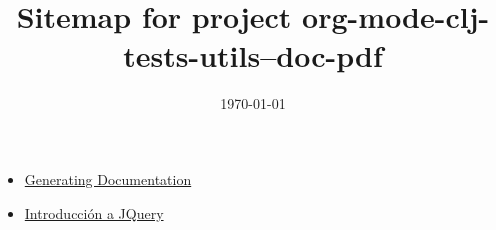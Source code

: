\documentclass[11pt]{article}
\date{\today}
\title{Sitemap for project org-mode-clj-tests-utils--doc-pdf}
\begin{document}
\maketitle
\tableofcontents

\begin{itemize}
\item \href{publish.org}{Generating Documentation}
\item \href{jquery.org}{Introducción a JQuery}
\end{itemize}
\end{document}
